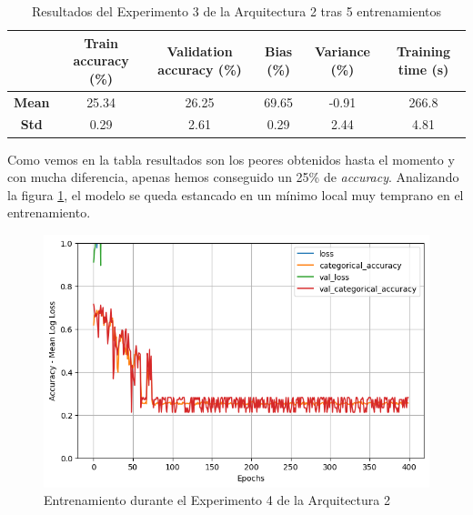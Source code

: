 \documentclass{article}
\begin{document}
			\begin{table}[!h]
				\begin{center}
					\begin{tabular}{ c | c | c | c | c | c |}
						\ & \textbf{Train accuracy (\%)} & \textbf{Validation accuracy (\%)} & \textbf{Bias (\%)} & \textbf{Variance (\%)} & \textbf{Training time (s)} \\ \hline
						\textbf{Mean} & 25.34 & 26.25 & 69.65 & -0.91 & 266.8 \\ \hline
						\textbf{Std} & 0.29 & 2.61 & 0.29 & 2.44 & 4.81 \\ \hline
					\end{tabular}
					\caption{Resultados del Experimento 3 de la Arquitectura 2 tras 5 entrenamientos}
					\label{tab:res-d-a2-e3}
				\end{center}
			\end{table}
			
			Como vemos en la tabla resultados son los peores obtenidos hasta el momento y con mucha diferencia, apenas hemos conseguido un 25\% de \textit{accuracy}. Analizando la figura \ref{d-tr-a2-e3}, el modelo se queda estancado en un m\'inimo local muy temprano en el entrenamiento.
			\begin{figure}[!h]
				\begin{center}
					\includegraphics[scale=0.5]{d-tr-a2-e3.png}		
					\caption{Entrenamiento durante el Experimento 4 de la Arquitectura 2}	
					\label{d-tr-a2-e3}
				\end{center}
			\end{figure}
			
\end{document}

